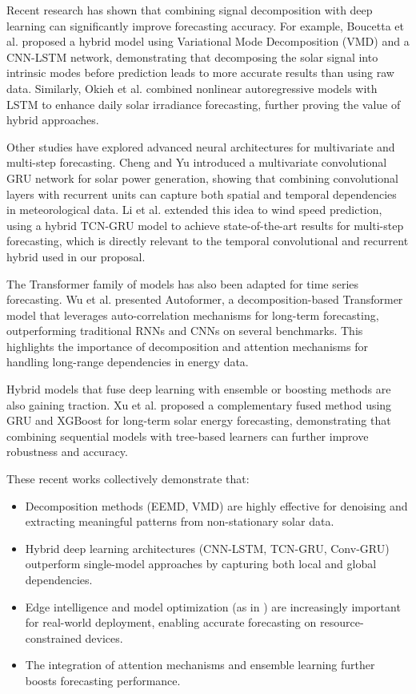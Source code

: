 \documentclass[conference]{IEEEtran}
\begin{document}
Recent research has shown that combining signal decomposition with deep learning can significantly improve forecasting accuracy. For example, Boucetta et al. \cite{b3} proposed a hybrid model using Variational Mode Decomposition (VMD) and a CNN-LSTM network, demonstrating that decomposing the solar signal into intrinsic modes before prediction leads to more accurate results than using raw data. Similarly, Okieh et al. \cite{b8} combined nonlinear autoregressive models with LSTM to enhance daily solar irradiance forecasting, further proving the value of hybrid approaches.

Other studies have explored advanced neural architectures for multivariate and multi-step forecasting. Cheng and Yu \cite{b4} introduced a multivariate convolutional GRU network for solar power generation, showing that combining convolutional layers with recurrent units can capture both spatial and temporal dependencies in meteorological data. Li et al. \cite{b5} extended this idea to wind speed prediction, using a hybrid TCN-GRU model to achieve state-of-the-art results for multi-step forecasting, which is directly relevant to the temporal convolutional and recurrent hybrid used in our proposal.

The Transformer family of models has also been adapted for time series forecasting. Wu et al. \cite{b6} presented Autoformer, a decomposition-based Transformer model that leverages auto-correlation mechanisms for long-term forecasting, outperforming traditional RNNs and CNNs on several benchmarks. This highlights the importance of decomposition and attention mechanisms for handling long-range dependencies in energy data.

Hybrid models that fuse deep learning with ensemble or boosting methods are also gaining traction. Xu et al. \cite{b7} proposed a complementary fused method using GRU and XGBoost for long-term solar energy forecasting, demonstrating that combining sequential models with tree-based learners can further improve robustness and accuracy.

These recent works collectively demonstrate that:
\begin{itemize}
    \item Decomposition methods (EEMD, VMD) are highly effective for denoising and extracting meaningful patterns from non-stationary solar data.
    \item Hybrid deep learning architectures (CNN-LSTM, TCN-GRU, Conv-GRU) outperform single-model approaches by capturing both local and global dependencies.
    \item Edge intelligence and model optimization (as in \cite{b2}) are increasingly important for real-world deployment, enabling accurate forecasting on resource-constrained devices.
    \item The integration of attention mechanisms and ensemble learning further boosts forecasting performance.
\end{itemize}
\end{document}
